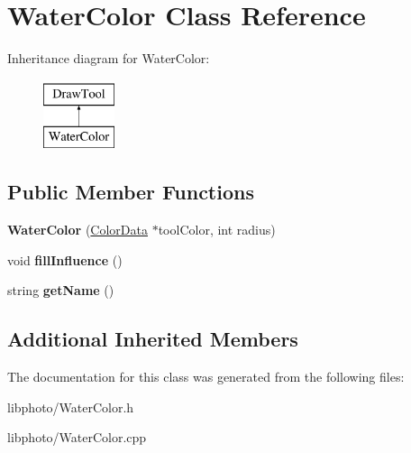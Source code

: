 \hypertarget{classWaterColor}{\section{Water\-Color Class Reference}
\label{classWaterColor}
}
Inheritance diagram for Water\-Color\-:\begin{figure}[H]
\begin{center}
\leavevmode
\includegraphics[height=2.000000cm]{classWaterColor}
\end{center}
\end{figure}
\subsection*{Public Member Functions}
\begin{DoxyCompactItemize}
\item 
\hypertarget{classWaterColor_ac61121474a9faeabc3610be7c6dd24b6}{{\bfseries Water\-Color} (\hyperlink{classColorData}{Color\-Data} $\ast$tool\-Color, int radius)}\label{classWaterColor_ac61121474a9faeabc3610be7c6dd24b6}

\item 
\hypertarget{classWaterColor_a98f3e467458f9a329c783d1c03af05db}{void {\bfseries fill\-Influence} ()}\label{classWaterColor_a98f3e467458f9a329c783d1c03af05db}

\item 
\hypertarget{classWaterColor_a6827a8d8fc051d1f64314da5d6b0229c}{string {\bfseries get\-Name} ()}\label{classWaterColor_a6827a8d8fc051d1f64314da5d6b0229c}

\end{DoxyCompactItemize}
\subsection*{Additional Inherited Members}


The documentation for this class was generated from the following files\-:\begin{DoxyCompactItemize}
\item 
libphoto/Water\-Color.\-h\item 
libphoto/Water\-Color.\-cpp\end{DoxyCompactItemize}
